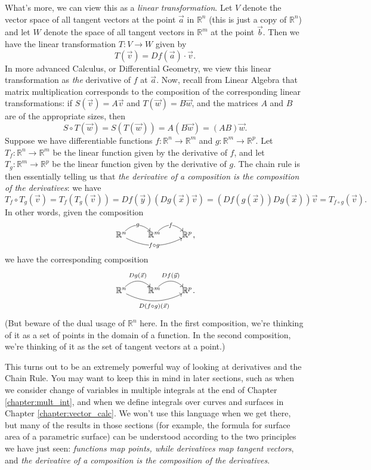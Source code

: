 What's more, we can view this as a \emph{linear transformation}. Let $V$ denote the vector space of all tangent vectors at the point $\vec{a}$ in $\mathbb{R}^n$ (this is just a copy of $\mathbb{R}^n$) and let $W$ denote the space of all tangent vectors in $\mathbb{R}^m$ at the point $\vec{b}$. Then we have the linear transformation $T:V\to W$ given by
\[
T(\vec{v}) = Df(\vec{a})\cdot \vec{v}.
\]
In more advanced Calculus, or Differential Geometry, we view this linear transformation as \emph{the} derivative of $f$ at $\vec{a}$. Now, recall from Linear Algebra that matrix multiplication corresponds to the composition of the corresponding linear transformations: if $S(\vec{v}) = A\vec{v}$ and $T(\vec{w}) = B\vec{w}$, and the matrices $A$ and $B$ are of the appropriate sizes, then
\[
S\circ T(\vec{w}) = S(T(\vec{w}))= A(B\vec{w}) = (AB)\vec{w}.
\]
Suppose we have differentiable functions $f:\mathbb{R}^n\to \mathbb{R}^m$ and $g:\mathbb{R}^m\to \mathbb{R}^p$.
Let $T_f:\mathbb{R}^n\to \mathbb{R}^m$ be the linear function given by the derivative of $f$, and let $T_g:\mathbb{R}^m\to \mathbb{R}^p$ be the linear function given by the derivative of $g$. The chain rule is then essentially telling us that {\em the derivative of a composition is the composition of the derivatives}: we have
\[
 T_f\circ T_g(\vec{v}) = T_f(T_g(\vec{v})) = D f(\vec{y})(D g(\vec{x})\vec{v}) = (D f(g(\vec{x}))D g(\vec{x}))\vec{v} = T_{f\circ g}(\vec{v}).
\]
In other words, given the composition
\[
 \xymatrix@1{\mathbb{R}^n \ar@/^1pc/[r]|g \ar@/_1pc/[rr]|{f\circ g} & \mathbb{R}^m \ar@/^1pc/[r]|f & \mathbb{R}^p},
\]
we have the corresponding composition
\[
 \xymatrix@1{\mathbb{R}^n \ar@/^1pc/[r]^{D g(\vec{x})} \ar@/_1pc/[rr]_{D(f\circ g)(\vec{x})} & \mathbb{R}^m \ar@/^1pc/[r]^{D f(\vec{y})} & \mathbb{R}^p}.
\]
(But beware of the dual usage of $\mathbb{R}^n$ here. In the first composition, we're thinking of it as a set of points in the domain of a function. In the second composition, we're thinking of it as the set of tangent vectors at a point.)

This turns out to be an extremely powerful way of looking at derivatives and the Chain Rule. You may want to keep this in mind in later sections, such as when we consider change of variables in multiple integrals at the end of Chapter \ref{chapter:mult_int}, and when we define integrals over curves and surfaces in Chapter \ref{chapter:vector_calc}. We won't use this language when we get there, but many of the results in those sections (for example, the formula for surface area of a parametric surface) can be understood according to the two principles we have just seen: \emph{functions map points, while derivatives map tangent vectors}, and \emph{the derivative of a composition is the composition of the derivatives}. 

\clearpage{\pagestyle{empty}\cleardoublepage}